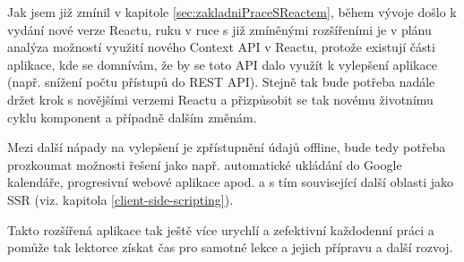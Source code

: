 Jak jsem již zmínil v kapitole \ref{sec:zakladniPraceSReactem}, během vývoje došlo k vydání nové verze Reactu, ruku v ruce s již zmíněnými rozšířeními je v plánu analýza možností využití nového Context API v Reactu, protože existují části aplikace, kde se domnívám, že by se toto API dalo využít k vylepšení aplikace (např. snížení počtu přístupů do REST API). Stejně tak bude potřeba nadále držet krok s novějšími verzemi Reactu a přizpůsobit se tak novému životnímu cyklu komponent a případně dalším změnám.

Mezi další nápady na vylepšení je zpřístupnění údajů offline, bude tedy potřeba prozkoumat možnosti řešení jako např. automatické ukládání do Google kalendáře, progresivní webové aplikace apod. a s tím související další oblasti jako SSR (viz. kapitola \ref{client-side-scripting}).

Takto rozšířená aplikace tak ještě více urychlí a zefektivní každodenní práci a pomůže tak lektorce získat čas pro samotné lekce a jejich přípravu a další rozvoj.

